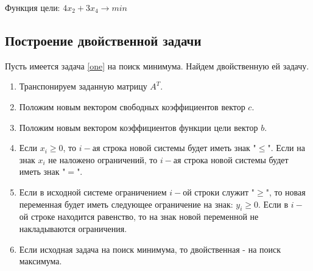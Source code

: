 \documentclass{article}
\begin{document}
Функция цели:  $4x_2+3x_4 \rightarrow min$

\subsection{Построение двойственной задачи}
\noindent Пусть имеется задача \eqref{one} на поиск минимума. Найдем двойственную ей задачу.
\begin{enumerate}
    \item Транспонируем заданную матрицу $A^T$.
    \item Положим новым вектором свободных коэффициентов вектор $c$.
    \item Положим новым вектором коэффициентов функции цели вектор $b$.
    \item Если $x_i\geq0$, то $i-$ая строка новой системы будет иметь знак "$\le$". Если на знак $x_i$ не наложено ограничений, то $i-$ая строка новой системы будет иметь знак "$=$".
    \item Если в исходной системе ограничением $i-$ой строки служит "$\geq$"\!, то новая переменная будет иметь следующее ограничение на знак: $y_i\geq0$. Если в $i-$ой строке находится равенство, то на знак новой переменной не накладываются ограничения. 
    \item Если исходная задача на поиск минимума, то двойственная - на поиск максимума.
\end{enumerate}
\end{document}
